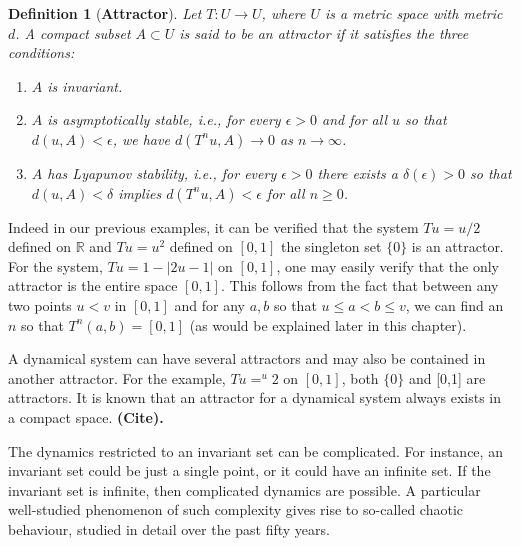 \documentclass[a4paper,12pt,twoside]{report}
\newtheorem{Definition}{Definition}[]
\begin{document}
\begin{Definition}
  [\bf Attractor]\label{Dfn_Attractor}\rm
  Let $T: U \to U$, where $U$  is a metric space with metric $d$. A compact subset $A \subset U$ is said to be an attractor if it satisfies the three conditions: 
  \vspace{-8mm}
  \begin{enumerate}
	\item $A$ is invariant. 
	\item $A$ is asymptotically stable, i.e., for every $\epsilon > 0$ and for all $u$ so that $d(u,A) < \epsilon$, we have $d(T^nu,A) \to 0$ as $n\to \infty$. 
	\item $A$ has Lyapunov stability, i.e., for every $\epsilon > 0$  there exists a $\delta(\epsilon) > 0$ so that $d(u,A) < \delta$ implies $d(T^nu,A) < \epsilon$ for all $n\ge 0$.  
\end{enumerate}
\end{Definition} 

Indeed in our previous examples, it can be verified that the system  $Tu=u/2$ defined on  $\mathbb{R}$ and $Tu=u^2$ defined on $[0,1]$  the singleton set $\{0\}$ is an attractor.  For the system,  $Tu=1-|2u-1|$ on $[0,1]$, one may easily verify that the only attractor is the entire space $[0,1]$. This follows from the fact that between any two points $u< v$ in $[0,1]$ and for any $a,b$ so that $u\le a < b \le v$, we can find an $n$ so that $T^n(a,b)=[0,1]$ (as would be explained later in this chapter). 

A dynamical system can have several attractors and may also be contained in another attractor. For the example, $Tu = ^u2$ on $[0,1]$, both $\{0\}$ and [0,1] are attractors. It is known that an attractor for a dynamical system always exists in a compact space. \textbf{(Cite).}

The dynamics restricted to an invariant set can be complicated. For instance, an invariant set could be just a single point, or it could have an infinite set. If the invariant set is infinite, then complicated dynamics are possible. A particular well-studied phenomenon of such complexity gives rise to so-called chaotic behaviour, studied in detail over the past fifty years.

\end{document}
